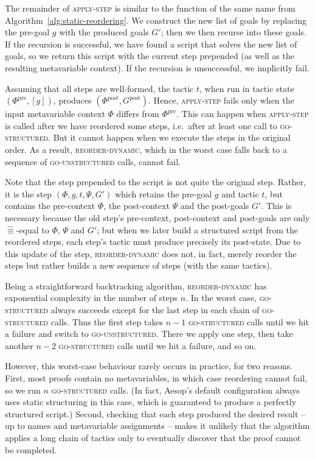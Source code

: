 \documentclass[sigplan,screen]{acmart}
\newcommand{\pre}{\mathrm{pre}}
\newcommand{\post}{\mathrm{post}}
\newcommand{\step}[5]{\ensuremath{(#1,\allowbreak #2,\allowbreak #3,\allowbreak #4,\allowbreak #5)}}
\newcommand{\aeq}{\mathrel{\hat{≡}}}
\begin{document}
The remainder of \textsc{apply-step} is similar to the function of the same name from Algorithm~\ref{alg:static-reordering}.
We construct the new list of goals by replacing the pre-goal $g$ with the produced goals $G'$; then we then recurse into these goals.
If the recursion is successful, we have found a script that solves the new list of goals, so we return this script with the current step prepended (as well as the resulting metavariable context).
If the recursion is unsuccessful, we implicitly fail.

Assuming that all steps are well-formed, the tactic $t$, when run in tactic state $(Φ^{\pre}, [g])$, produces $(Φ^{\post}, G^{\post})$.
Hence, \textsc{apply-step} fails only when the input metavariable context $Φ$ differs from $Φ^{\pre}$.
This can happen when \textsc{apply-step} is called after we have reordered some steps, i.e.\ after at least one call to \textsc{go-structured}.
But it cannot happen when we execute the steps in the original order.
As a result, \textsc{reorder-dynamic}, which in the worst case falls back to a sequence of \textsc{go-unstructured} calls, cannot fail.

Note that the step prepended to the script is not quite the original step.
Rather, it is the step $\step{Φ}{g}{t}{Ψ}{G'}$ which retains the pre-goal $g$ and tactic $t$, but contains the pre-context $Φ$, the post-context $Ψ$ and the post-goals $G'$.
This is necessary because the old step's pre-context, post-context and post-goals are only $\aeq$-equal to $Φ$, $Ψ$ and $G'$; but when we later build a structured script from the reordered steps, each step's tactic must produce precisely its post-state.
Due to this update of the step, \textsc{reorder-dynamic} does not, in fact, merely reorder the steps but rather builds a new sequence of steps (with the same tactics).

Being a straightforward backtracking algorithm, \textsc{reorder-dynamic} has exponential complexity in the number of steps $n$.
In the worst case, \textsc{go-structured} always succeeds except for the last step in each chain of \textsc{go-structured} calls.
Thus the first step takes $n-1$ \textsc{go-structured} calls until we hit a failure and switch to \textsc{go-unstructured}.
There we apply one step, then take another $n-2$ \textsc{go-structured} calls until we hit a failure, and so on.

However, this worst-case behaviour rarely occurs in practice, for two reasons.
First, most proofs contain no metavariables, in which case reordering cannot fail, so we run $n$ \textsc{go-structured} calls.
(In fact, Aesop's default configuration always uses static structuring in this case, which is guaranteed to produce a perfectly structured script.)
Second, checking that each step produced the desired result -- up to names and metavariable assignments -- makes it unlikely that the algorithm applies a long chain of tactics only to eventually discover that the proof cannot be completed.
\end{document}
